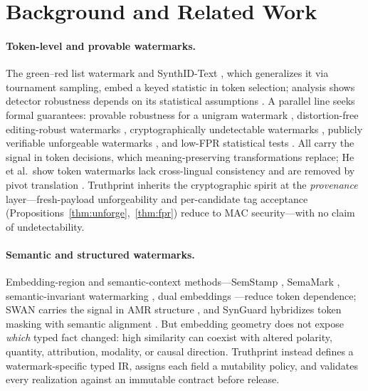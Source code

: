 \documentclass[11pt]{article}
\begin{document}
\section{Background and Related Work}
\paragraph{Token-level and provable watermarks.}
The green--red list watermark \cite{kirchenbauer2023kgw} and SynthID-Text \cite{dathathri2024synthid,synthidgithub,hf_synthid}, which generalizes it via tournament sampling, embed a keyed statistic in token selection; analysis shows detector robustness depends on its statistical assumptions \cite{omidi2026synthidanalysis}. A parallel line seeks formal guarantees: provable robustness for a unigram watermark \cite{zhao2023provable}, distortion-free editing-robust watermarks \cite{kuditipudi2024distortionfree}, cryptographically undetectable watermarks \cite{christ2024undetectable}, publicly verifiable unforgeable watermarks \cite{liu2024unforgeable}, and low-FPR statistical tests \cite{fernandez2023threebricks}. All carry the signal in token decisions, which meaning-preserving transformations replace; He et al.\ show token watermarks lack cross-lingual consistency and are removed by pivot translation \cite{he2024crosslingual}. Truthprint inherits the cryptographic spirit at the \emph{provenance} layer---fresh-payload unforgeability and per-candidate tag acceptance (Propositions~\ref{thm:unforge},~\ref{thm:fpr}) reduce to MAC security---with no claim of undetectability.

\paragraph{Semantic and structured watermarks.}
Embedding-region and semantic-context methods---SemStamp \cite{hou2024semstamp}, SemaMark \cite{ren2024semmark}, semantic-invariant watermarking \cite{liu2023sir}, dual embeddings \cite{schaefer2026dew}---reduce token dependence; SWAN carries the signal in AMR structure \cite{ye2026swan}, and SynGuard hybridizes token masking with semantic alignment \cite{han2025synguard}. But embedding geometry does not expose \emph{which} typed fact changed: high similarity can coexist with altered polarity, quantity, attribution, modality, or causal direction. Truthprint instead defines a watermark-specific typed IR, assigns each field a mutability policy, and validates every realization against an immutable contract before release.
\end{document}
